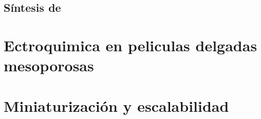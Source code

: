 	\subsection{Síntesis de \pdm}


	
	

 	

	


		




	 	

\section{Ectroquimica en peliculas delgadas mesoporosas}
	
\section{Miniaturización y escalabilidad}\label{sec:microfabricacion}\label{sec:intro_fotolito}
	
